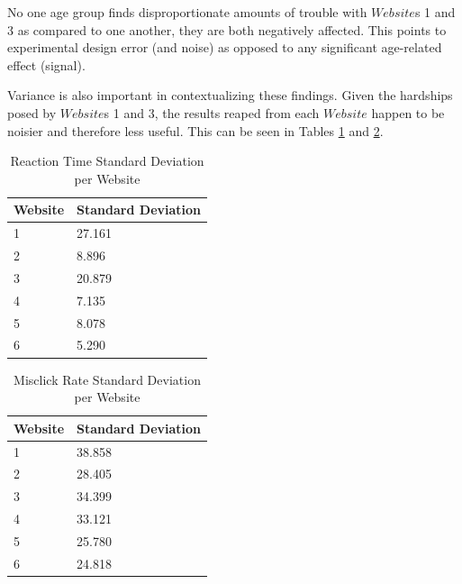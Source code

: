 \documentclass[12pt,twoside]{reedthesis}
\begin{document}
    No one age group finds disproportionate amounts of trouble with $Website$s 1 and 3 as compared to one another, they are both negatively affected. This points to experimental design error (and noise) as opposed to any significant age-related effect (signal). 

    Variance is also important in contextualizing these findings. Given the hardships posed by $Website$s 1 and 3, the results reaped from each $Website$ happen to be noisier and therefore less useful. This can be seen in Tables \ref{speed_var} and \ref{mr_var}. 

    \begin{table}[H]
        \centering
        \begin{tabular}{| p{3.5cm} | p{3.5cm} |}
            \hline
            Website & Standard Deviation\\
            \hline
            1 & 27.161\\
            \hline
            2 & 8.896\\
            \hline
            3 & 20.879\\
            \hline
            4 & 7.135\\
            \hline
            5 & 8.078\\
            \hline
            6 &  5.290\\
            \hline
        \end{tabular}
        \caption{Reaction Time Standard Deviation per Website}
        \label{speed_var}
    \end{table}

    \begin{table}[H]
        \centering
        \begin{tabular}{| p{3.5cm} | p{3.5cm} |}
            \hline
            Website & Standard Deviation\\
            \hline
            1 & 38.858\\
            \hline
            2 & 28.405\\
            \hline
            3 & 34.399\\
            \hline
            4 & 33.121\\
            \hline
            5 & 25.780\\
            \hline
            6 & 24.818\\
            \hline
        \end{tabular}
        \caption{Misclick Rate Standard Deviation per Website}
        \label{mr_var}
    \end{table}
\end{document}
